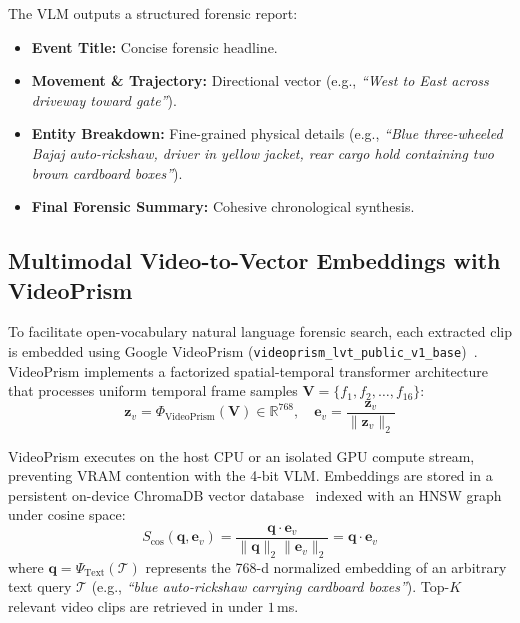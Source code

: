 \documentclass[10pt, conference]{IEEEtran}
\begin{document}
The VLM outputs a structured forensic report:
\begin{itemize}
    \item \textbf{Event Title:} Concise forensic headline.
    \item \textbf{Movement \& Trajectory:} Directional vector (e.g., \textit{``West to East across driveway toward gate''}).
    \item \textbf{Entity Breakdown:} Fine-grained physical details (e.g., \textit{``Blue three-wheeled Bajaj auto-rickshaw, driver in yellow jacket, rear cargo hold containing two brown cardboard boxes''}).
    \item \textbf{Final Forensic Summary:} Cohesive chronological synthesis.
\end{itemize}

\subsection{Multimodal Video-to-Vector Embeddings with VideoPrism}
To facilitate open-vocabulary natural language forensic search, each extracted clip is embedded using Google VideoPrism (\texttt{videoprism\_lvt\_public\_v1\_base})~\cite{videoprism2024}. VideoPrism implements a factorized spatial-temporal transformer architecture that processes uniform temporal frame samples $\mathbf{V} = \{f_1, f_2, \dots, f_{16}\}$:
\begin{equation}
\label{eq:videoprism}
\mathbf{z}_v = \Phi_{\text{VideoPrism}}(\mathbf{V}) \in \mathbb{R}^{768}, \quad \mathbf{e}_v = \frac{\mathbf{z}_v}{\|\mathbf{z}_v\|_2}
\end{equation}

VideoPrism executes on the host CPU or an isolated GPU compute stream, preventing VRAM contention with the 4-bit VLM. Embeddings are stored in a persistent on-device ChromaDB vector database~\cite{chromadb2023} indexed with an HNSW graph under cosine space:
\begin{equation}
\label{eq:cosine_sim}
S_{\text{cos}}(\mathbf{q}, \mathbf{e}_v) = \frac{\mathbf{q} \cdot \mathbf{e}_v}{\|\mathbf{q}\|_2 \|\mathbf{e}_v\|_2} = \mathbf{q} \cdot \mathbf{e}_v
\end{equation}
where $\mathbf{q} = \Psi_{\text{Text}}(\mathcal{T})$ represents the 768-d normalized embedding of an arbitrary text query $\mathcal{T}$ (e.g., \textit{``blue auto-rickshaw carrying cardboard boxes''}). Top-$K$ relevant video clips are retrieved in under $1$\,ms.
\end{document}

